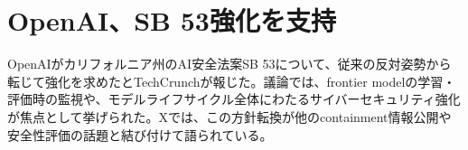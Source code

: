 \section{OpenAI、SB 53強化を支持}
OpenAIがカリフォルニア州のAI安全法案SB 53について、従来の反対姿勢から転じて強化を求めたとTechCrunchが報じた。議論では、frontier modelの学習・評価時の監視や、モデルライフサイクル全体にわたるサイバーセキュリティ強化が焦点として挙げられた。Xでは、この方針転換が他のcontainment情報公開や安全性評価の話題と結び付けて語られている。
